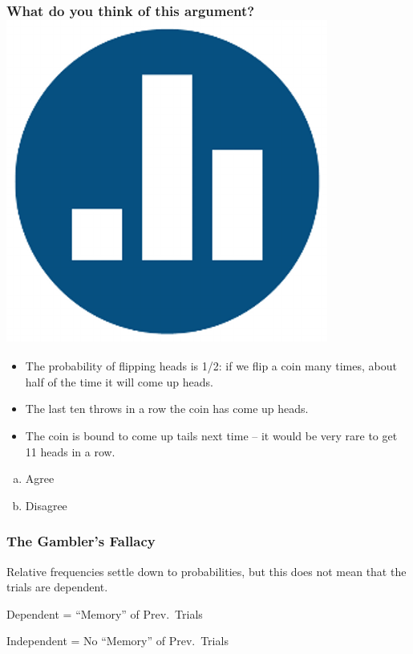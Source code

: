 \documentclass[handout]{beamer}
\begin{document}
\begin{frame}

\frametitle{What do you think of this argument? \hfill \includegraphics[scale = 0.05]{./images/clicker}}
\begin{itemize}
	\item The probability of flipping heads is 1/2: if we flip a coin many times, about half of the time it will come up heads.
	\item The last ten throws in a row the coin has come up heads.
	\item The coin is bound to come up tails next time -- it would be very rare to get 11 heads in a row.
\end{itemize}

\begin{enumerate}[(a)]
	\item Agree
	\item Disagree
\end{enumerate}

\end{frame}
\begin{frame}

\frametitle{The Gambler's Fallacy}

\begin{alertblock}{Relative frequencies settle down to probabilities, but this does not mean that the trials are dependent.}\end{alertblock}


\begin{block}{Dependent = ``Memory'' of Prev.\ Trials}\end{block}

\begin{block}{Independent = No ``Memory'' of Prev.\ Trials}\end{block}



\end{frame}
\end{document}
